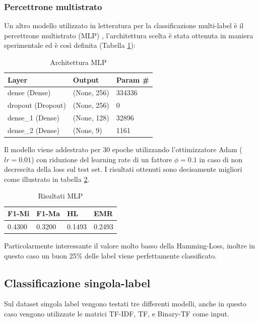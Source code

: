 \documentclass[technote]{IEEEtran}
\begin{document}
\subsubsection{Percettrone multistrato}
Un altro modello utilizzato in letteratura per la classificazione multi-label è il percettrone multistrato (MLP) \cite{Rosenblatt1963PRINCIPLESON}, l'architettura scelta è stata ottenuta in maniera sperimentale ed è così definita (Tabella \ref{t_mlp_arch}):
\begin{table}[H]
\centering
\caption{Architettura MLP}
\begin{tabular}{|l|l|l|}
\hline
\textbf{Layer} & \textbf{Output} & \textbf{Param \#} \\ \hline
dense (Dense)         & (None, 256)           & 334336            \\ \hline
dropout (Dropout)     & (None, 256)           & 0                 \\ \hline
dense\_1 (Dense)      & (None, 128)           & 32896             \\ \hline
dense\_2 (Dense)      & (None, 9)             & 1161              \\ \hline
\end{tabular}
\label{t_mlp_arch}
\end{table}
Il modello viene addestrato per 30 epoche utilizzando l'ottimizzatore Adam ($ lr = 0.01 $) con riduzione del learning rate di un fattore $ \phi = 0.1 $ in caso di non decrescita della loss sul test set.
I risultati ottenuti sono decisamente migliori come illustrato in tabella \ref{t_res_mlp}.
\begin{table}[H]
\centering
\caption{Risultati MLP}
\begin{tabular}{|l|l|l|l|}
\hline
\textbf{F1-Mi} & \textbf{F1-Ma} & \textbf{HL} & \textbf{EMR} \\ \hline
0.4300         & 0.3200         & 0.1493      & 0.2493       \\ \hline
\end{tabular}
\label{t_res_mlp}
\end{table}
Particolarmente interessante il valore molto basso della Hamming-Loss, inoltre in questo caso un buon 25\% delle label viene perfettamente classificato.

\subsection{Classificazione singola-label}
Sul dataset singola label vengono testati tre differenti modelli, anche in questo caso vengono utilizzate le matrici TF-IDF, TF, e Binary-TF come input.
\end{document}
